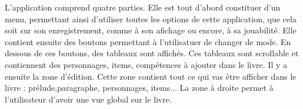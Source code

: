 		L'application comprend quatre parties. Elle est tout d'abord constituer d'un menu, permettant ainsi d'utiliser toutes les options de cette application, que cela soit sur son enregistrement, comme à son afichage ou encore, à sa jouabilité.
		Elle contient ensuite des boutons permettant à l'utilisatuer de changer de mode. En dessous de ces boutons, des tableaux sont affichés. Ces tableaux sont scrollable et contiennent des personnages, items, compétences à ajouter dans le livre.
		Il y a ensuite la zone d'édition. Cette zone contient tout ce qui vas être afficher dans le livre : prélude,paragraphe, personnages, items...
		La zone à droite permet à l'utilisateur d'avoir une vue global sur le livre.
